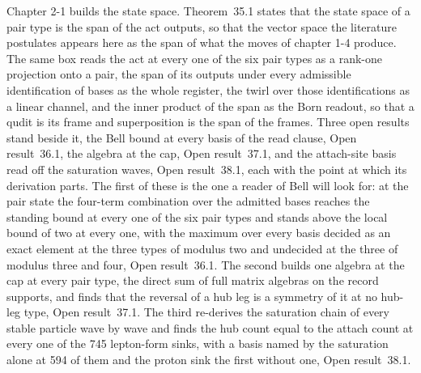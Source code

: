 Chapter 2-1 builds the state space. Theorem~35.1 states that the state space of a pair type is the span of the act outputs, so that the vector space the literature postulates appears here as the span of what the moves of chapter 1-4 produce. The same box reads the act at every one of the six pair types as a rank-one projection onto a pair, the span of its outputs under every admissible identification of bases as the whole register, the twirl over those identifications as a linear channel, and the inner product of the span as the Born readout, so that a qudit is its frame and superposition is the span of the frames. Three open results stand beside it, the Bell bound at every basis of the read clause, Open result~36.1, the algebra at the cap, Open result~37.1, and the attach-site basis read off the saturation waves, Open result~38.1, each with the point at which its derivation parts. The first of these is the one a reader of Bell will look for: at the pair state the four-term combination over the admitted bases reaches the standing bound at every one of the six pair types and stands above the local bound of two at every one, with the maximum over every basis decided as an exact element at the three types of modulus two and undecided at the three of modulus three and four, Open result~36.1. The second builds one algebra at the cap at every pair type, the direct sum of full matrix algebras on the record supports, and finds that the reversal of a hub leg is a symmetry of it at no hub-leg type, Open result~37.1. The third re-derives the saturation chain of every stable particle wave by wave and finds the hub count equal to the attach count at every one of the 745 lepton-form sinks, with a basis named by the saturation alone at 594 of them and the proton sink the first without one, Open result~38.1.

